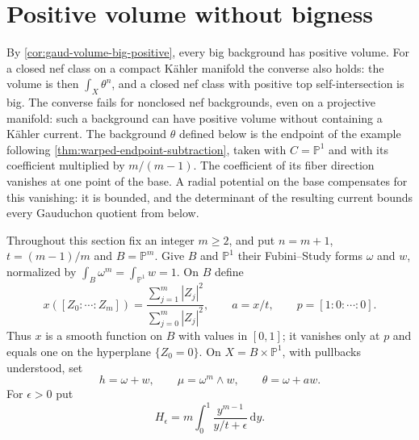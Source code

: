 \section{Positive volume without bigness}
\label{sec:radial-positive-volume-nonbig}

By \cref{cor:gaud-volume-big-positive}, every big background has positive volume. For a closed nef class on a compact K\"ahler manifold the converse also holds: the volume is then $\int_X\theta^n$, and a closed nef class with positive top self-intersection is big. The converse fails for nonclosed nef backgrounds, even on a projective manifold: such a background can have positive volume without containing a K\"ahler current. The background $\theta$ defined below is the endpoint of the example following \cref{thm:warped-endpoint-subtraction}, taken with $C=\mathbb P^1$ and with its coefficient multiplied by $m/(m-1)$. The coefficient of its fiber direction vanishes at one point of the base. A radial potential on the base compensates for this vanishing: it is bounded, and the determinant of the resulting current bounds every Gauduchon quotient from below.

Throughout this section fix an integer $m\geq2$, and put $n=m+1$, $t=(m-1)/m$ and $B=\mathbb P^m$. Give $B$ and $\mathbb P^1$ their Fubini--Study forms $\omega$ and $w$, normalized by $\int_B\omega^m=\int_{\mathbb P^1}w=1$. On $B$ define
\[
 x([Z_0:\cdots:Z_m])=
 \frac{\sum_{j=1}^m|Z_j|^2}{\sum_{j=0}^m|Z_j|^2},
 \qquad a=x/t,\qquad p=[1:0:\cdots:0].
\]
Thus $x$ is a smooth function on $B$ with values in $[0,1]$; it vanishes only at $p$ and equals one on the hyperplane $\{Z_0=0\}$. On $X=B\times\mathbb P^1$, with pullbacks understood, set
\[
 h=\omega+w,\qquad \mu=\omega^m\wedge w,
 \qquad\theta=\omega+a w.
\]
For $\epsilon>0$ put
\begin{equation}\label{eq:radial-volume-normalization}
 H_\epsilon=m\int_0^1\frac{y^{m-1}}{y/t+\epsilon}\,\mathrm{d}y.
\end{equation}

